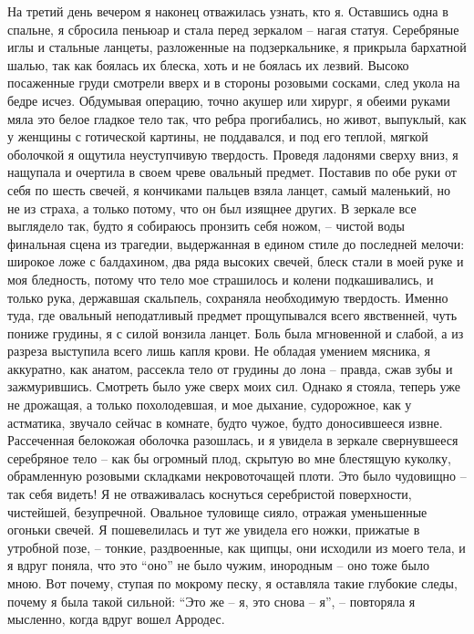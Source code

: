 На третий день вечером я наконец  отважилась узнать, кто я. Оставшись одна в
спальне,  я  сбросила  пеньюар  и  стала перед  зеркалом  --  нагая  статуя.
Серебряные  иглы  и  стальные  ланцеты,  разложенные  на  подзеркальнике,  я
прикрыла бархатной  шалью, так как боялась  их блеска, хоть и  не боялась их
лезвий. Высоко посаженные груди смотрели вверх и в стороны розовыми сосками,
след укола  на бедре исчез. Обдумывая  операцию, точно акушер или  хирург, я
обеими руками  мяла это белое  гладкое тело  так, что ребра  прогибались, но
живот, выпуклый,  как у женщины с  готической картины, не поддавался,  и под
его  теплой,  мягкой оболочкой  я  ощутила  неуступчивую твердость.  Проведя
ладонями сверху вниз, я нащупала и  очертила в своем чреве овальный предмет.
Поставив по  обе руки  от себя  по шесть свечей,  я кончиками  пальцев взяла
ланцет,  самый маленький,  но не  из  страха, а  только потому,  что он  был
изящнее других. В зеркале все выглядело так, будто я собираюсь пронзить себя
ножом,  -- чистой  воды финальная  сцена из  трагедии, выдержанная  в едином
стиле  до последней  мелочи: широкое  ложе  с балдахином,  два ряда  высоких
свечей,  блеск стали  в  моей руке  и  моя бледность,  потому  что тело  мое
страшилось  и  колени подкашивались,  и  только  рука, державшая  скальпель,
сохраняла  необходимую твердость.  Именно  туда,  где овальный  неподатливый
предмет  прощупывался  всего явственней,  чуть  пониже  грудины, я  с  силой
вонзила ланцет. Боль была мгновенной и  слабой, а из разреза выступила всего
лишь  капля крови.  Не обладая  умением  мясника, я  аккуратно, как  анатом,
рассекла  тело от  грудины  до лона  -- правда,  сжав  зубы и  зажмурившись.
Смотреть было уже сверх моих сил. Однако я стояла, теперь уже не дрожащая, а
только похолодевшая,  и мое  дыхание, судорожное,  как у  астматика, звучало
сейчас  в  комнате,  будто  чужое,  будто  доносившееся  извне.  Рассеченная
белокожая оболочка разошлась, и я  увидела в зеркале свернувшееся серебряное
тело -- как бы огромный плод,  скрытую во мне блестящую куколку, обрамленную
розовыми  складками некровоточащей  плоти. Это  было чудовищно  -- так  себя
видеть!  Я не  отваживалась  коснуться  серебристой поверхности,  чистейшей,
безупречной. Овальное туловище сияло,  отражая уменьшенные огоньки свечей. Я
пошевелилась  и тут  же  увидела его  ножки, прижатые  в  утробной позе,  --
тонкие,  раздвоенные, как  щипцы,  они исходили  из моего  тела,  и я  вдруг
поняла, что это ``оно'' не было чужим,  инородным -- оно тоже было мною. Вот
почему, ступая по мокрому песку, я  оставляла такие глубокие следы, почему я
была  такой сильной:  ``Это  же --  я,  это  снова --  я'',  -- повторяла  я
мысленно, когда вдруг вошел Арродес.


